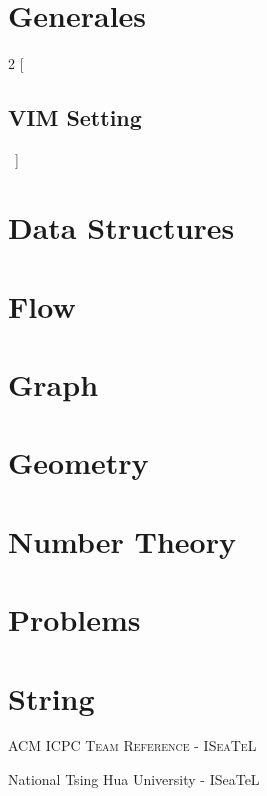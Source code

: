 \documentclass[a4paper]{amsart}
\newcommand{\includecpp}[3]{
  \begin{multicols}{2}
    [\subsection{#1}\ ]
    
  \end{multicols}
}
\begin{document}
  \thispagestyle{fancy}
  \begin{center}

    \

  \end{center}

  \section{Generales}
   \includecpp{VIM Setting}{.}{vimrc.cpp}
 
  \section{Data Structures}

  \section{Flow}
  
  \section{Graph}
  
  \section{Geometry}   
    
  \section{Number Theory}

  \section{Problems}
       
  \section{String}
     

  \enlargethispage*{\baselineskip}
  \pagebreak

  \begin{center}
    \Huge\textsc{ACM ICPC Team Reference - ISeaTeL}

    \vspace{0.35cm}

    \huge National Tsing Hua University - ISeaTeL

    \vspace{0.35cm}

  \end{center}
\end{document}
